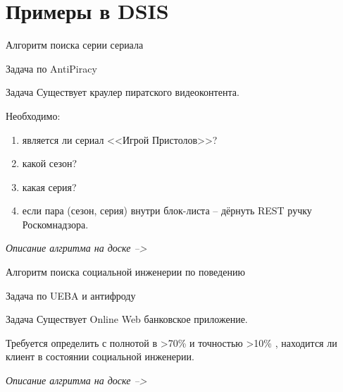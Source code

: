 



\section{Примеры в DSIS}\label{section:examples_2_dsis}

\begin{frame}{Алгоритм поиска серии сериала}
	
	Задача по AntiPiracy
	
	\begin{block}{Задача}
		Существует краулер пиратского видеоконтента.
		
		Необходимо:
		\begin{enumerate}
			\item является ли сериал <<Игрой Пристолов>>?
			\item какой сезон?
			\item какая серия?
			\item если пара (сезон, серия) внутри блок-листа -- дёрнуть REST ручку Роскомнадзора.
		\end{enumerate}
	\end{block}
	
	\textit{Описание алгритма на доске --> }
	
	
\end{frame}


\begin{frame}{Алгоритм поиска социальной инженерии по поведению}
	
	Задача по UEBA и антифроду
	
	\begin{block}{Задача}
		Существует Online Web банковское приложение.
		
		Требуется определить с полнотой в >70\% и точностью >10\% , находится ли клиент в состоянии социальной инженерии.
	
	\end{block}
	
	\textit{Описание алгритма на доске --> }
	
	
\end{frame}


